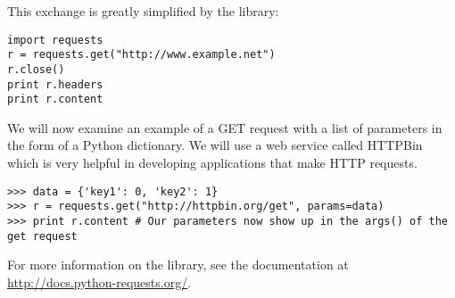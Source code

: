This exchange is greatly simplified by the  library:

\begin{lstlisting}
import requests
r = requests.get("http://www.example.net")
r.close()
print r.headers
print r.content
\end{lstlisting}

We will now examine an example of a GET request with a list of parameters in the form of a Python dictionary.
We will use a web service called HTTPBin which is very helpful in developing applications that make HTTP requests.

\begin{lstlisting}
>>> data = {'key1': 0, 'key2': 1}
>>> r = requests.get("http://httpbin.org/get", params=data)
>>> print r.content # Our parameters now show up in the args() of the get request
\end{lstlisting}

For more information on the  library, see the documentation at \url{http://docs.python-requests.org/}.

\begin{comment}
When we post to a server, we have the option of sending data.
This data can be a file object, a dictionary or a string.
To send our data via post, we first serialize it to JSON and then send the resulting string to the request.
\begin{lstlisting}
>>> p = requests.post("http://httpbin.org/post", data=json.dumps(data))
>>> print p.content
\end{lstlisting}
\end{comment}

